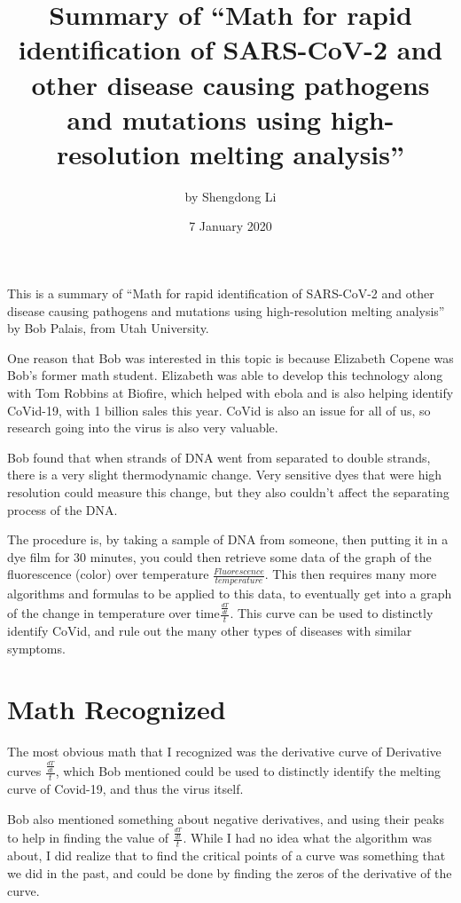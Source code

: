 \documentclass[12pt]{article}
\begin{document}
\title{
Summary of ``Math for rapid identification of SARS-CoV-2 and other disease causing pathogens and mutations using high-resolution melting analysis''
}
\author{by Shengdong Li}
\date{7 January 2020}
\maketitle

This is a summary of ``Math for rapid identification of SARS-CoV-2 and other disease causing pathogens and mutations using high-resolution melting analysis'' by Bob Palais, from Utah University.

One reason that Bob was interested in this topic is because Elizabeth Copene was Bob's former math student. Elizabeth was able to develop this technology along with Tom Robbins at Biofire, which helped with ebola and is also helping identify CoVid-19, with 1 billion sales this year. CoVid is also an issue for all of us, so research going into the virus is also very valuable.

Bob found that when strands of DNA went from separated to double strands, there is a very slight thermodynamic change. Very sensitive dyes that were high resolution could measure this change, but they also couldn't affect the separating process of the DNA\@. 

The procedure is, by taking a sample of DNA from someone, then putting it in a dye film for 30 minutes, you could then retrieve some data of the graph of the fluorescence (color) over temperature $\frac{Fluorescence}{temperature}$. This then requires many more algorithms and formulas to be applied to this data, to eventually get into a graph of the change in temperature over time$\frac{\frac{dT}{dt}}{t}$. This curve can be used to distinctly identify CoVid, and rule out the many other types of diseases with similar symptoms. 

\section{Math Recognized} 
The most obvious math that I recognized was the derivative curve of Derivative curves $\frac{\frac{dT}{dt}}{t}$, which Bob mentioned could be used to distinctly identify the melting curve of Covid-19, and thus the virus itself.

Bob also mentioned something about negative derivatives, and using their peaks to help in finding the value of $\frac{\frac{dT}{dt}}{t}$. While I had no idea what the algorithm was about, I did realize that to find the critical points of a curve was something that we did in the past, and could be done by finding the zeros of the derivative of the curve. 
\end{document}
